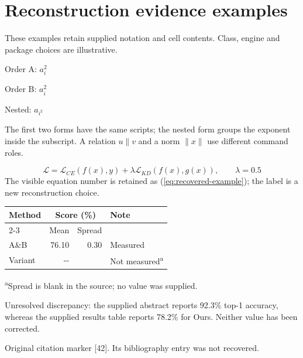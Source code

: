 \documentclass{article}
\begin{document}
\section*{Reconstruction evidence examples}
These examples retain supplied notation and cell contents. Class, engine and
package choices are illustrative.

\noindent Order A: \(a_i^2\)\par
\noindent Order B: \(a^2_i\)\par
\noindent Nested: \(a_{i^2}\)\par
The first two forms have the same scripts; the nested form groups the exponent
inside the subscript. A relation \(u\parallel v\) and a norm \(\lVert x\rVert\)
use different command roles.

\begin{equation}
  \mathcal{L}=\mathcal{L}_{CE}(f(x),y)
    +\lambda\mathcal{L}_{KD}(f(x),g(x)),\qquad \lambda=0.5
  \tag{7}\label{eq:recovered-example}
\end{equation}
The visible equation number is retained as (\ref{eq:recovered-example}); the
label is a new reconstruction choice.

\begin{center}
\begin{tabular}{lrrl}
\toprule
Method & \multicolumn{2}{c}{Score (\%)} & Note \\
\cmidrule(lr){2-3}
 & Mean & Spread & \\
\midrule
A\&B & 76.10 & 0.30 & Measured \\
Variant & -{}- & & Not measured\textsuperscript{a} \\
\bottomrule
\end{tabular}
\end{center}
\noindent\textsuperscript{a}Spread is blank in the source; no value was supplied.

\noindent Unresolved discrepancy: the supplied abstract reports 92.3\% top-1
accuracy, whereas the supplied results table reports 78.2\% for Ours.
Neither value has been corrected.

\noindent Original citation marker [42]. Its bibliography entry was not recovered.
\end{document}
